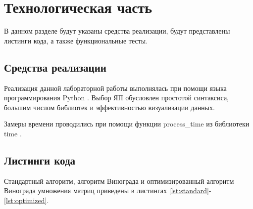 \chapter{Технологическая часть}

В данном разделе будут указаны средства реализации, будут представлены листинги кода, а также функциональные тесты.

\section{Средства реализации}

Реализация данной лабораторной работы выполнялась при помощи языка программирования Python \cite{python}. Выбор ЯП обусловлен простотой синтаксиса, большим числом библиотек и эффективностью визуализации данных.

Замеры времени проводились при помощи функции process\_time из библиотеки time \cite{python-time}.

\section{Листинги кода}

Стандартный алгоритм, алгоритм Винограда и оптимизированный алгоритм Винограда умножения матриц приведены в листингах \ref{lst:standard}-\ref{lst:optimized}.

